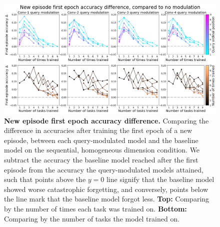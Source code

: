 \begin{figure}[!htb]
\centering
\includegraphics[width=\linewidth]{ch-results/figures/query_mod_benchmark/first_task_accuracy_comparison.png}
\caption{ {\bf New episode first epoch accuracy difference.} Comparing the difference in accuracies after training the first epoch of a new episode, between each query-modulated model and the baseline model on the sequential, homogeneous dimension condition. We subtract the accuracy the baseline model reached after the first episode from the accuracy the query-modulated models attained, such that points above the $y=0$ line signify that the baseline model showed worse catastrophic forgetting, and conversely, points below the line mark that the baseline model forgot less. \textbf{Top:} Comparing by the number of times each task was trained on. \textbf{Bottom:} Comparing by the number of tasks the model trained on. }
\label{fig:results-query-mod-benchmark-first-task-accuracy-comparison}
\end{figure}

